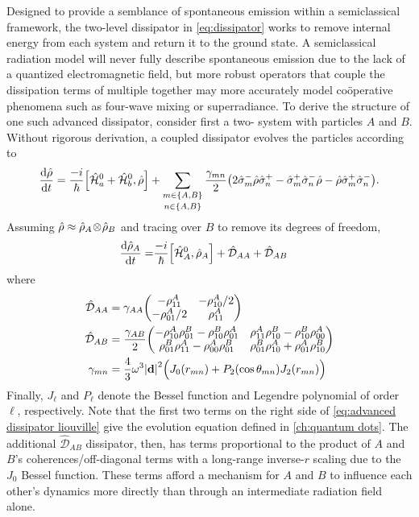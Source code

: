 Designed to provide a semblance of spontaneous emission within a semiclassical framework, the two-level dissipator in \cref{eq:dissipator} works to remove internal energy from each \qd{} system and return it to the ground state.
A semiclassical radiation model will never fully describe spontaneous emission due to the lack of a quantized electromagnetic field, but more robust operators that couple the dissipation terms of multiple \qds{} together may more accurately model co\"operative phenomena such as four-wave mixing or superradiance. 
To derive the structure of one such advanced dissipator, consider first a two-\qd{} system with particles $A$ and $B$.
Without rigorous derivation, a coupled dissipator evolves the particles according to
\begin{equation}
  \dv{\hat{\rho}}{t} = \frac{-i}{\hbar} \commutator{\hat{\mathcal{H}}_a^0 + \hat{\mathcal{H}}_b^0}{\hat{\rho}} + \sum_{\shortstack{$\scriptstyle m \in \qty{A, B}$\\$\scriptstyle n \in \qty{A, B}$}} \frac{\gamma_{mn}}{2} \qty(2 \hat{\sigma}_m^- \hat{\rho} \hat{\sigma}_n^+ - \hat{\sigma}_m^+ \hat{\sigma}_n^- \hat{\rho} - \hat{\rho} \hat{\sigma}_m^+ \hat{\sigma}_n^-).
\end{equation}
Assuming $\hat{\rho} \approx \hat{\rho}_A \! \otimes \! \hat{\rho}_B$ and tracing over $B$ to remove its degrees of freedom,
\begin{equation}
  \begin{aligned}
    \dv{\hat{\rho}_A}{t} =& \frac{-i}{\hbar} \commutator{\hat{\mathcal{H}}_A^0}{\hat{\rho}_A} + \hat{\mathcal{D}}_{AA} + \hat{\mathcal{D}}_{AB}
  \end{aligned}
  \label{eq:advanced dissipator liouville}
\end{equation}
where
\begin{subequations}
  \begin{align}
    \hat{\mathcal{D}}_{AA} &= \gamma_{AA} \mqty(-\rho_{11}^A & -\rho_{10}^A/2 \\ -\rho_{01}^A/2 & \rho_{11}^A) \\
    \hat{\mathcal{D}}_{AB} &= \frac{\gamma_{AB}}{2} \mqty(-\rho_{10}^A\rho_{01}^B - \rho_{10}^B \rho_{01}^A & \rho_{11}^A\rho_{10}^B - \rho_{10}^B\rho_{00}^A \\ \rho_{01}^B\rho_{11}^A - \rho_{00}^A\rho_{01}^B & \rho_{01}^B \rho_{10}^A + \rho_{01}^A \rho_{10}^B) \\
    \gamma_{mn} &= \frac{4}{3}\omega^3 \abs{\vb{d}}^2 \qty\Big(J_0(r_{mn}) + P_2(\cos \theta_{mn}) J_2(r_{mn}))
  \end{align}
  \label{eq:cross matrices}
\end{subequations}
Finally, $J_\ell$ and $P_\ell$ denote the Bessel function and Legendre polynomial of order $\ell$, respectively.
Note that the first two terms on the right side of \cref{eq:advanced dissipator liouville} give the evolution equation defined in \cref{ch:quantum dots}.
The additional $\hat{\mathcal{D}}_{AB}$ dissipator, then, has terms proportional to the product of $A$ and $B$'s coherences/off-diagonal terms with a long-range inverse-$r$ scaling due to the $J_0$ Bessel function.
These terms afford a mechanism for $A$ and $B$ to influence each other's dynamics more directly than through an intermediate radiation field alone.

